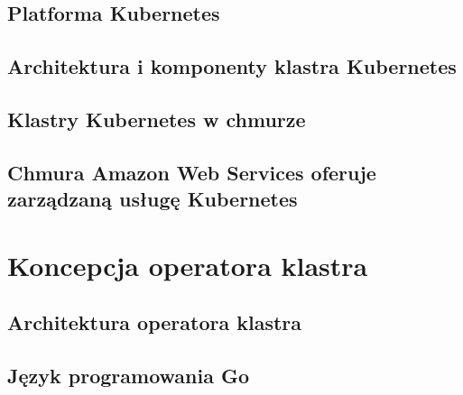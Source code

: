 \subsection{Platforma Kubernetes}

\subsection{Architektura i komponenty klastra Kubernetes}

\subsection{Klastry Kubernetes w chmurze}

\subsection{Chmura Amazon Web Services oferuje zarządzaną usługę Kubernetes}


\section{Koncepcja operatora klastra}

\subsection{Architektura operatora klastra}

\subsection{Język programowania Go}

